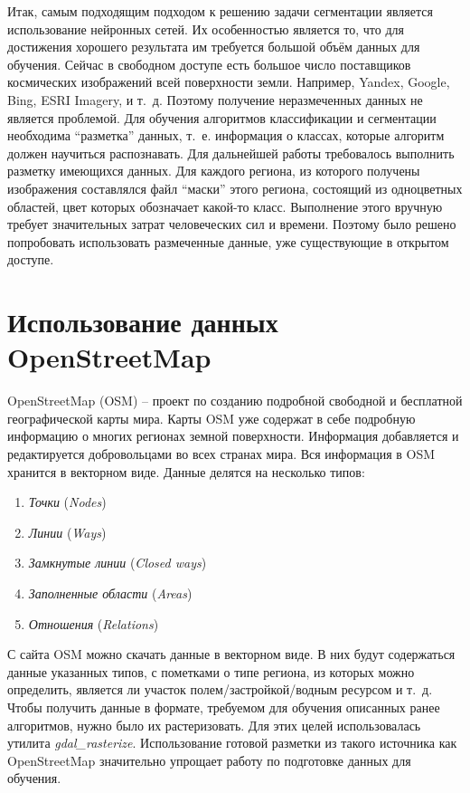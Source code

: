 Итак, самым подходящим подходом к решению задачи сегментации является
использование нейронных сетей. Их особенностью является то, что для достижения
хорошего результата им требуется большой объём данных для обучения. Сейчас в
свободном доступе есть большое число поставщиков космических изображений всей
поверхности земли.  Например, Yandex, Google, Bing, ESRI Imagery, и т. д.
Поэтому получение неразмеченных данных не является проблемой. Для обучения
алгоритмов классификации и сегментации необходима ``разметка'' данных, т. е.
информация о классах, которые алгоритм должен научиться распознавать. Для
дальнейшей работы требовалось выполнить разметку имеющихся данных. Для каждого
региона, из которого получены изображения составлялся файл ``маски'' этого
региона, состоящий из одноцветных областей, цвет которых обозначает какой-то
класс. Выполнение этого вручную требует значительных затрат человеческих сил и
времени. Поэтому было решено попробовать использовать размеченные данные, уже
существующие в открытом доступе.


\section*{Использование данных OpenStreetMap}
OpenStreetMap (OSM) – проект по созданию подробной свободной и бесплатной
географической карты мира. Карты OSM уже содержат в себе подробную информацию о
многих регионах земной поверхности. Информация добавляется и редактируется
добровольцами во всех странах мира. Вся информация в OSM хранится в векторном
виде.  Данные делятся на несколько типов:
\begin{enumerate}
    \item \textit{Точки} (\textit{Nodes})
    \item \textit{Линии} (\textit{Ways})
    \item \textit{Замкнутые линии} (\textit{Closed ways})
    \item \textit{Заполненные области} (\textit{Areas})
    \item \textit{Отношения} (\textit{Relations})
\end{enumerate}
С сайта OSM можно скачать данные в векторном виде. В них будут содержаться
данные указанных типов, с пометками о типе региона, из которых можно определить,
является ли участок полем/застройкой/водным ресурсом и т. д.
Чтобы получить данные в формате, требуемом для обучения описанных ранее
алгоритмов, нужно было их растеризовать. Для этих целей использовалась утилита
\textit{gdal\_rasterize}.
Использование готовой разметки из такого источника как OpenStreetMap значительно
упрощает работу по подготовке данных для обучения.

